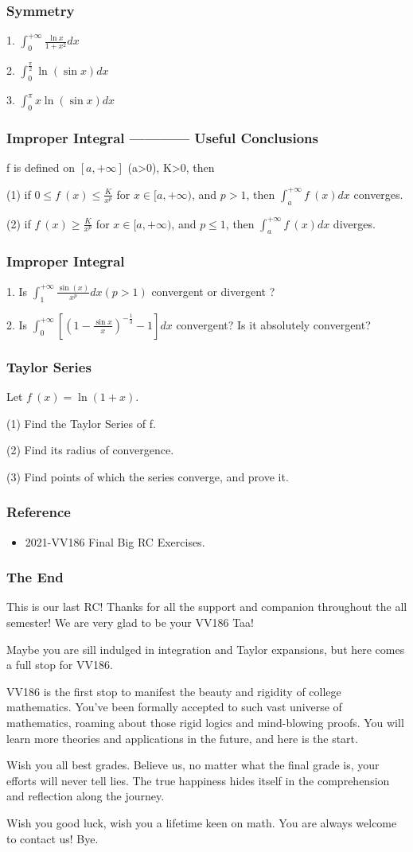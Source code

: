 \documentclass{beamer}
\begin{document}
\begin{frame}
    \frametitle{Symmetry}
    1. $\int_{0}^{+\infty}\frac{\ln x}{1+x^2} dx$

    2. $\int_{0}^{\frac{\pi}{2}}\ln (\sin x) dx$

    3. $\int_{0}^{\pi} x \ln (\sin x) dx$
\end{frame}

\begin{frame}
    \frametitle{Improper Integral ———— Useful Conclusions}
    f is defined on $[a,+\infty]$ (a>0), K>0, then

    (1) if $0\leq f~(x) \leq \frac{K}{x^p}$ for $x\in [a,+\infty)$, and $p>1$, then  $\int_{a}^{+\infty}f~(x) dx$ converges.

    (2) if $f~(x) \geq \frac{K}{x^p}$ for $x\in [a,+\infty)$, and $p\leq 1$, then  $\int_{a}^{+\infty}f~(x) dx$ diverges.
\end{frame}

\begin{frame}
    \frametitle{Improper Integral}
    1. Is $\int_{1}^{+\infty}\frac{\sin(x)}{x^p} dx (p>1)$ convergent or divergent ?

    2. Is $\int_{0}^{+\infty}[(1-\frac{\sin x}{x})^{-\frac{1}{3}}-1] dx$ convergent? Is it absolutely convergent?
\end{frame}

\begin{frame}
    \frametitle{Taylor Series}
    Let $f~(x)=\ln (1+x)$.

    (1) Find the Taylor Series of f.

    (2) Find its radius of convergence.

    (3) Find points of which the series converge, and prove it.
\end{frame}

\begin{frame}
    \frametitle{Reference}
    \begin{itemize}
        \item 2021-VV186 Final Big RC Exercises.
    \end{itemize}
\end{frame}
\begin{frame}
    \frametitle{The End}
    This is our last RC! Thanks for all the support and companion throughout the all semester! We are very glad to be your VV186 Taa!

    Maybe you are sill indulged in integration and Taylor expansions, but here comes a full stop for VV186.

    VV186 is the first stop to manifest the beauty and rigidity of college mathematics. You've been formally accepted to such vast universe of mathematics, roaming about those rigid logics and mind-blowing proofs. You will learn more theories and applications in the future, and here is the start.

    Wish you all best grades. Believe us, no matter what the final grade is, your efforts will never tell lies. The true happiness hides itself in the comprehension and reflection along the journey.

    Wish you good luck, wish you a lifetime keen on math.
    You are always welcome to contact us! Bye.

\end{frame}
\end{document}
